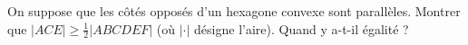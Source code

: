 On suppose que les côtés opposés d'un hexagone convexe sont parallèles. Montrer que $|ACE| \geq \frac{1}{2}|ABCDEF|$ (où $|\cdot|$ désigne l'aire). Quand y a-t-il égalité ?
